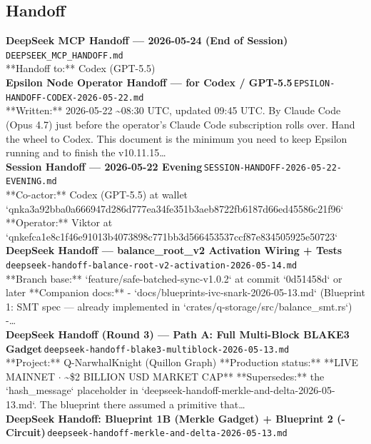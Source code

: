 \documentclass[11pt,a4paper]{article}
\begin{document}
\subsection*{Handoff}
\noindent\textbf{DeepSeek MCP Handoff --- 2026-05-24 (End of Session)}\,\textcolor{qgray}{\small \texttt{DEEPSEEK\_MCP\_HANDOFF.md}}\\
**Handoff to:** Codex (GPT-5.5)\\[6pt]
\noindent\textbf{Epsilon Node Operator Handoff --- for Codex / GPT-5.5}\,\textcolor{qgray}{\small \texttt{EPSILON-HANDOFF-CODEX-2026-05-22.md}}\\
**Written:** 2026-05-22 \textasciitilde{}08:30 UTC, updated 09:45 UTC. By Claude Code (Opus 4.7) just before the operator's Claude Code subscription rolls over. Hand the wheel to Codex. This document is the minimum you need to keep Epsilon running and to finish the v10.11.15\ldots{}\\[6pt]
\noindent\textbf{Session Handoff --- 2026-05-22 Evening}\,\textcolor{qgray}{\small \texttt{SESSION-HANDOFF-2026-05-22-EVENING.md}}\\
**Co-actor:** Codex (GPT-5.5) at wallet `qnka3a92bba0a666947d286d777ea34fe351b3aeb8722fb6187d66ed45586c21f96` **Operator:** Viktor at `qnkefca1e8c1f46e91013b4073898c771bb3d566453537ccf87e834505925e50723`\\[6pt]
\noindent\textbf{DeepSeek Handoff --- balance\_root\_v2 Activation Wiring + Tests}\,\textcolor{qgray}{\small \texttt{deepseek-handoff-balance-root-v2-activation-2026-05-14.md}}\\
**Branch base:** `feature/safe-batched-sync-v1.0.2` at commit `0d51458d` or later **Companion docs:** - `docs/blueprints-ivc-snark-2026-05-13.md` (Blueprint 1: SMT spec --- already implemented in `crates/q-storage/src/balance\_smt.rs`) -\ldots{}\\[6pt]
\noindent\textbf{DeepSeek Handoff (Round 3) --- Path A: Full Multi-Block BLAKE3 Gadget}\,\textcolor{qgray}{\small \texttt{deepseek-handoff-blake3-multiblock-2026-05-13.md}}\\
**Project:** Q-NarwhalKnight (Quillon Graph) **Production status:** **LIVE MAINNET $\cdot$ \textasciitilde{}\$2 BILLION USD MARKET CAP** **Supersedes:** the `hash\_message` placeholder in `deepseek-handoff-merkle-and-delta-2026-05-13.md`. The blueprint there assumed a primitive that\ldots{}\\[6pt]
\noindent\textbf{DeepSeek Handoff: Blueprint 1B (Merkle Gadget) + Blueprint 2 (\textdelta{}-Circuit)}\,\textcolor{qgray}{\small \texttt{deepseek-handoff-merkle-and-delta-2026-05-13.md}}\\
\end{document}
